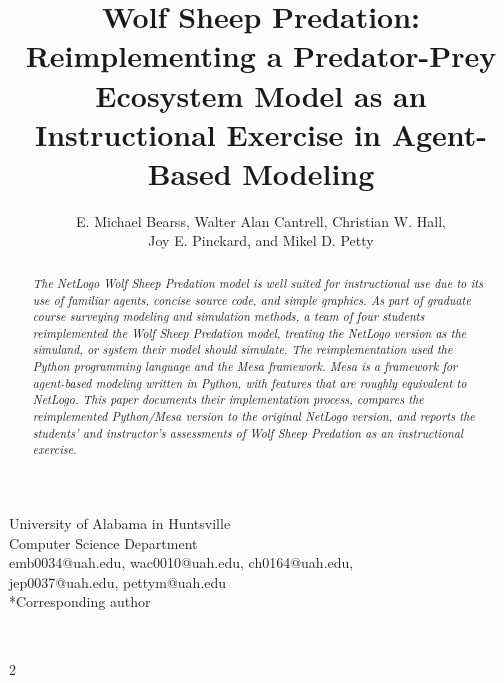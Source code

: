 \documentclass[12pt]{article}
\title{Wolf Sheep Predation:  Reimplementing a Predator-Prey Ecosystem Model
    as an Instructional Exercise in Agent-Based Modeling}
\author{E. Michael Bearss, Walter Alan Cantrell, Christian W. Hall, \\
    Joy E. Pinckard, and Mikel D. Petty}\vspace{-2ex}
\date{}
\begin{document}
    \maketitle
    \noindent
    \begin{center}
        University of Alabama in Huntsville \\
        Computer Science Department \\
        emb0034@uah.edu, wac0010@uah.edu, ch0164@uah.edu, \\
        jep0037@uah.edu, pettym@uah.edu \\
        *Corresponding author
    \end{center}

    \begin{abstract}\vspace{-2ex}
    \noindent
    \textit{
        The NetLogo Wolf Sheep Predation model is well suited for instructional use due
        to its use of familiar agents, concise source code, and simple graphics.
        As part of graduate course surveying modeling and simulation methods,
        a team of four students reimplemented the Wolf Sheep Predation model,
        treating the NetLogo version as the simuland, or system their model should simulate.
        The reimplementation used the Python programming language and the Mesa framework.
        Mesa is a framework for agent-based modeling written in Python,
        with features that are roughly equivalent to NetLogo.
        This paper documents their implementation process, compares the reimplemented
        Python/Mesa version to the original NetLogo version, and reports the students'
        and instructor's assessments of Wolf Sheep Predation as an instructional exercise.
    }
    \end{abstract}

    \begin{multicols}{2}
    
    
    
    
    ~\cite{python-mesa-2020}
    
    

\end{multicols}{2}
\end{document}
